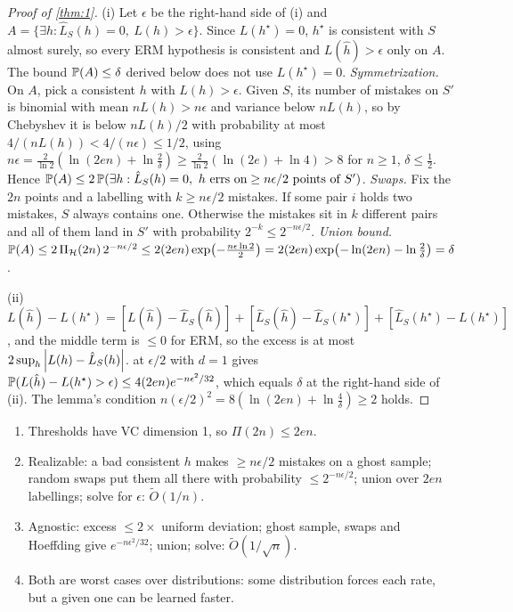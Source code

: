 \begin{proof}[Proof of \cref{thm:1}]
(i) Let $\epsilon$ be the right-hand side of (i) and $A=\{\exists h:\hat L_S(h)=0,\ L(h)>\epsilon\}$.
Since $L(h^\star)=0$, $h^\star$ is consistent with $S$ almost surely, so every ERM hypothesis is
consistent and $L(\hat h)>\epsilon$ only on $A$. The bound $\P(A)\le\delta$ derived below does not
use $L(h^\star)=0$.
\emph{Symmetrization.} On $A$, pick a consistent $h$ with $L(h)>\epsilon$. Given $S$, its number
of mistakes on $S'$ is binomial with mean $nL(h)>n\epsilon$ and variance below $nL(h)$, so by
Chebyshev it is below $nL(h)/2$ with probability at most $4/(nL(h))<4/(n\epsilon)\le1/2$, using
$n\epsilon=\frac{2}{\ln2}(\ln(2en)+\ln\frac2\delta)\ge\frac{2}{\ln2}(\ln(2e)+\ln4)>8$ for $n\ge1$,
$\delta\le\frac12$. Hence
$\P(A)\le2\,\P(\exists h:\hat L_S(h)=0,\ h\text{ errs on}\ge n\epsilon/2\text{ points of }S')$.
\emph{Swaps.} Fix the $2n$ points and a labelling with $k\ge n\epsilon/2$ mistakes. If some pair
$i$ holds two mistakes, $S$ always contains one. Otherwise the mistakes sit in $k$ different
pairs and all of them land in $S'$ with probability $2^{-k}\le2^{-n\epsilon/2}$.
\emph{Union bound.} $\P(A)\le2\,\Pi_\cH(2n)\,2^{-n\epsilon/2}\le2(2en)\exp\bigl(-\tfrac{n\epsilon\ln2}2\bigr)
=2(2en)\exp\bigl(-\ln(2en)-\ln\tfrac2\delta\bigr)=\delta$.

(ii) $L(\hat h)-L(h^\star)=[L(\hat h)-\hat L_S(\hat h)]+[\hat L_S(\hat h)-\hat L_S(h^\star)]+[\hat L_S(h^\star)-L(h^\star)]$,
and the middle term is $\le0$ for ERM, so the excess is at most $2\sup_h\abs{L(h)-\hat L_S(h)}$.
 at $\epsilon/2$ with $d=1$ gives $\P(L(\hat h)-L(h^\star)>\epsilon)\le4(2en)e^{-n\epsilon^2/32}$,
which equals $\delta$ at the right-hand side of (ii). The lemma's condition
$n(\epsilon/2)^2=8(\ln(2en)+\ln\frac4\delta)\ge2$ holds.
\end{proof}

\begin{inshort}
\begin{enumerate}[leftmargin=*]
  \item Thresholds have VC dimension 1, so $\Pi(2n)\le2en$.
  \item Realizable: a bad consistent $h$ makes $\ge n\epsilon/2$ mistakes on a ghost sample; random
    swaps put them all there with probability $\le2^{-n\epsilon/2}$; union over $2en$ labellings;
    solve for $\epsilon$: $\tilde O(1/n)$.
  \item Agnostic: excess $\le2\times$ uniform deviation; ghost sample, swaps and Hoeffding give
    $e^{-n\epsilon^2/32}$; union; solve: $\tilde O(1/\sqrt n)$.
  \item Both are worst cases over distributions: some distribution forces each rate, but a given
    one can be learned faster.
\end{enumerate}
\end{inshort}

